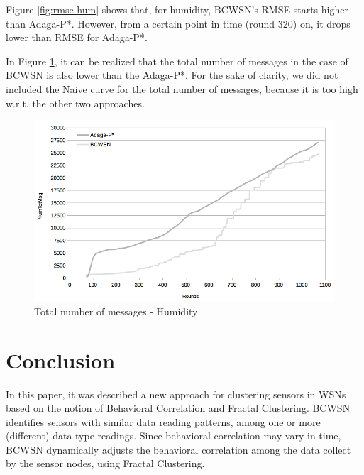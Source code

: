 \documentclass{acm_proc_article-sp}
\begin{document}
Figure \ref{fig:rmse-hum} shows that, for humidity, BCWSN's RMSE starts higher
than Adaga-P*. However, from a certain point in time (round 320) on, it drops
lower than RMSE for Adaga-P*.
\vspace*{-.3cm}

In Figure \ref{fig:tot-num-msg-hum}, it can be realized that the total number of
messages in the case of BCWSN is also lower than the Adaga-P*. For the sake of
clarity, we did not included the Naive curve for the total number of messages,
because it is too high w.r.t. the other two approaches.

\begin{figure}[!htb]
\begin{center}
	\includegraphics[scale=0.3]{BCWSN-TotNumMsgxRound-PB-Hum.png}
	 \vspace*{-.6cm}
    \caption{Total number of messages - Humidity}
    \label{fig:tot-num-msg-hum}
\end{center}
\end{figure}
\vspace*{-.3cm}

\section{Conclusion}
\label{conclusion}

In this paper, it was described a new approach for clustering sensors in WSNs
based on the notion of Behavioral Correlation and Fractal Clustering.
BCWSN identifies sensors with similar data reading patterns, among one or more
(different) data type readings. Since behavioral correlation may vary in time,
BCWSN dynamically adjusts the behavioral correlation among the data collect by
the sensor nodes, using Fractal Clustering.
\vspace*{-.3cm}
\end{document}
